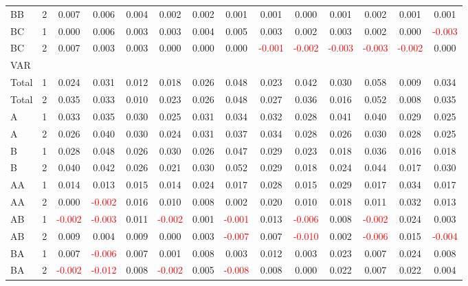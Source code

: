 \begin{table}[H]
{\begin{tabular}{llcccccccccccc}
BB & 2 & 0.007 & 0.006 & 0.004 & 0.002 & 0.002 & 0.001 & 0.001 & 0.000 & 0.001 & 0.002 & 0.001 & 0.001\\
BC & 1 & 0.000 & 0.006 & 0.003 & 0.003 & 0.004 & 0.005 & 0.003 & 0.002 & 0.003 & 0.002 & 0.000 & \textcolor{red}{-0.003}\\
BC & 2 & 0.007 & 0.003 & 0.003 & 0.000 & 0.000 & 0.000 & \textcolor{red}{-0.001} & \textcolor{red}{-0.002} & \textcolor{red}{-0.003} & \textcolor{red}{-0.003} & \textcolor{red}{-0.002} & 0.000\\
\hline
VAR &  &  &  &  &  &  &  &  &  &  &  &  & \\
\hline
Total & 1 & 0.024 & 0.031 & 0.012 & 0.018 & 0.026 & 0.048 & 0.023 & 0.042 & 0.030 & 0.058 & 0.009 & 0.034\\
Total & 2 & 0.035 & 0.033 & 0.010 & 0.023 & 0.026 & 0.048 & 0.027 & 0.036 & 0.016 & 0.052 & 0.008 & 0.035\\
A & 1 & 0.033 & 0.035 & 0.030 & 0.025 & 0.031 & 0.034 & 0.032 & 0.028 & 0.041 & 0.040 & 0.029 & 0.025\\
A & 2 & 0.026 & 0.040 & 0.030 & 0.024 & 0.031 & 0.037 & 0.034 & 0.028 & 0.026 & 0.030 & 0.028 & 0.025\\
B & 1 & 0.028 & 0.048 & 0.026 & 0.030 & 0.026 & 0.047 & 0.029 & 0.023 & 0.018 & 0.036 & 0.016 & 0.018\\
B & 2 & 0.040 & 0.042 & 0.026 & 0.021 & 0.030 & 0.052 & 0.029 & 0.018 & 0.024 & 0.044 & 0.017 & 0.030\\
AA & 1 & 0.014 & 0.013 & 0.015 & 0.014 & 0.024 & 0.017 & 0.028 & 0.015 & 0.029 & 0.017 & 0.034 & 0.017\\
AA & 2 & 0.000 & \textcolor{red}{-0.002} & 0.016 & 0.010 & 0.008 & 0.002 & 0.020 & 0.010 & 0.018 & 0.011 & 0.032 & 0.013\\
AB & 1 & \textcolor{red}{-0.002} & \textcolor{red}{-0.003} & 0.011 & \textcolor{red}{-0.002} & 0.001 & \textcolor{red}{-0.001} & 0.013 & \textcolor{red}{-0.006} & 0.008 & \textcolor{red}{-0.002} & 0.024 & 0.003\\
AB & 2 & 0.009 & 0.004 & 0.009 & 0.000 & 0.003 & \textcolor{red}{-0.007} & 0.007 & \textcolor{red}{-0.010} & 0.002 & \textcolor{red}{-0.006} & 0.015 & \textcolor{red}{-0.004}\\
BA & 1 & 0.007 & \textcolor{red}{-0.006} & 0.007 & 0.001 & 0.008 & 0.003 & 0.012 & 0.003 & 0.023 & 0.007 & 0.024 & 0.008\\
BA & 2 & \textcolor{red}{-0.002} & \textcolor{red}{-0.012} & 0.008 & \textcolor{red}{-0.002} & 0.005 & \textcolor{red}{-0.008} & 0.008 & 0.000 & 0.022 & 0.007 & 0.022 & 0.004\\

\end{tabular}}
\end{table}
